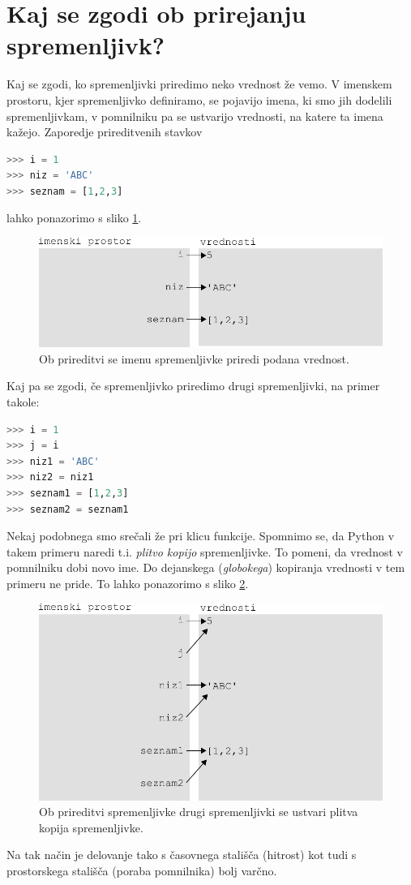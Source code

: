 \section{Kaj se zgodi ob prirejanju spremenljivk?}
Kaj se zgodi, ko spremenljivki priredimo neko vrednost že vemo. V imenskem prostoru, kjer spremenljivko definiramo, se pojavijo imena, ki smo jih dodelili spremenljivkam, v pomnilniku pa se ustvarijo vrednosti, na katere ta imena kažejo. Zaporedje prireditvenih stavkov
\begin{lstlisting}[language=Python]
>>> i = 1
>>> niz = 'ABC'
>>> seznam = [1,2,3]
\end{lstlisting}
lahko ponazorimo s sliko \ref{img:spremenljivost}.
\begin{figure}
    \centering
    \includegraphics[width=\linewidth]{img/spremenljivost.pdf}
    \caption{Ob prireditvi se imenu spremenljivke priredi podana vrednost.}
    \label{img:spremenljivost}
\end{figure}
Kaj pa se zgodi, če spremenljivko priredimo drugi spremenljivki, na primer takole:
\begin{lstlisting}[language=Python]
>>> i = 1
>>> j = i
>>> niz1 = 'ABC'
>>> niz2 = niz1
>>> seznam1 = [1,2,3]
>>> seznam2 = seznam1
\end{lstlisting}
Nekaj podobnega smo srečali že pri klicu funkcije. Spomnimo se, da Python v takem primeru naredi t.i. \textit{plitvo kopijo} spremenljivke. To pomeni, da vrednost v pomnilniku dobi novo ime. Do dejanskega (\textit{globokega}) kopiranja vrednosti v tem primeru ne pride. To lahko ponazorimo s sliko \ref{img:spremenljivost_2}.
\begin{figure}
    \centering
    \includegraphics[width=\linewidth]{img/spremenljivost_2.pdf}
    \caption{Ob prireditvi spremenljivke drugi spremenljivki se ustvari plitva kopija spremenljivke.}
    \label{img:spremenljivost_2}
\end{figure}
Na tak način je delovanje tako s časovnega stališča (hitrost) kot tudi s prostorskega stališča (poraba pomnilnika) bolj varčno. 

